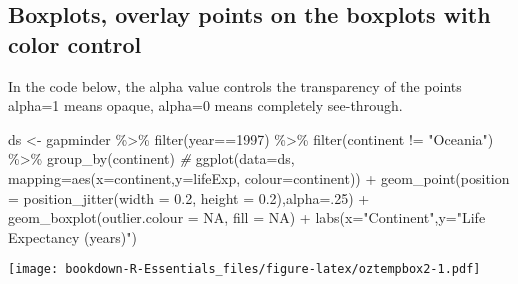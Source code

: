 \documentclass[
]{book}
\newenvironment{Shaded}{\begin{snugshade}}{\end{snugshade}}
\newcommand{\AttributeTok}[1]{\textcolor[rgb]{0.77,0.63,0.00}{#1}}
\newcommand{\CommentTok}[1]{\textcolor[rgb]{0.56,0.35,0.01}{\textit{#1}}}
\newcommand{\ConstantTok}[1]{\textcolor[rgb]{0.00,0.00,0.00}{#1}}
\newcommand{\DecValTok}[1]{\textcolor[rgb]{0.00,0.00,0.81}{#1}}
\newcommand{\FloatTok}[1]{\textcolor[rgb]{0.00,0.00,0.81}{#1}}
\newcommand{\FunctionTok}[1]{\textcolor[rgb]{0.00,0.00,0.00}{#1}}
\newcommand{\NormalTok}[1]{#1}
\newcommand{\OtherTok}[1]{\textcolor[rgb]{0.56,0.35,0.01}{#1}}
\newcommand{\SpecialCharTok}[1]{\textcolor[rgb]{0.00,0.00,0.00}{#1}}
\newcommand{\StringTok}[1]{\textcolor[rgb]{0.31,0.60,0.02}{#1}}
\begin{document}
\hypertarget{boxplots-overlay-points-on-the-boxplots-with-color-control}{%
\subsection{Boxplots, overlay points on the boxplots with color control}\label{boxplots-overlay-points-on-the-boxplots-with-color-control}}

In the code below, the alpha value controls the transparency of the points alpha=1 means opaque, alpha=0 means completely see-through.

\begin{Shaded}
\begin{Highlighting}[]
\NormalTok{ds }\OtherTok{\textless{}{-}}\NormalTok{ gapminder }\SpecialCharTok{\%\textgreater{}\%} 
  \FunctionTok{filter}\NormalTok{(year}\SpecialCharTok{==}\DecValTok{1997}\NormalTok{) }\SpecialCharTok{\%\textgreater{}\%} 
  \FunctionTok{filter}\NormalTok{(continent }\SpecialCharTok{!=} \StringTok{"Oceania"}\NormalTok{) }\SpecialCharTok{\%\textgreater{}\%} 
  \FunctionTok{group\_by}\NormalTok{(continent) }
\CommentTok{\# }
\FunctionTok{ggplot}\NormalTok{(}\AttributeTok{data=}\NormalTok{ds, }\AttributeTok{mapping=}\FunctionTok{aes}\NormalTok{(}\AttributeTok{x=}\NormalTok{continent,}\AttributeTok{y=}\NormalTok{lifeExp, }\AttributeTok{colour=}\NormalTok{continent)) }\SpecialCharTok{+} 
  \FunctionTok{geom\_point}\NormalTok{(}\AttributeTok{position =} \FunctionTok{position\_jitter}\NormalTok{(}\AttributeTok{width =} \FloatTok{0.2}\NormalTok{, }\AttributeTok{height =} \FloatTok{0.2}\NormalTok{),}\AttributeTok{alpha=}\NormalTok{.}\DecValTok{25}\NormalTok{) }\SpecialCharTok{+}
 \FunctionTok{geom\_boxplot}\NormalTok{(}\AttributeTok{outlier.colour =} \ConstantTok{NA}\NormalTok{, }\AttributeTok{fill =} \ConstantTok{NA}\NormalTok{) }\SpecialCharTok{+} 
  \FunctionTok{labs}\NormalTok{(}\AttributeTok{x=}\StringTok{"Continent"}\NormalTok{,}\AttributeTok{y=}\StringTok{"Life Expectancy (years)"}\NormalTok{)}
\end{Highlighting}
\end{Shaded}

\texttt{[image: bookdown-R-Essentials\_files/figure-latex/oztempbox2-1.pdf]}
\end{document}
